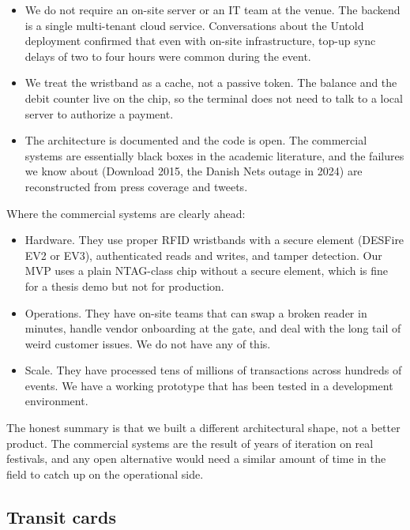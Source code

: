 \begin{itemize}
    \item We do not require an on-site server or an IT team at the venue. The backend is a single multi-tenant cloud service. Conversations about the Untold deployment confirmed that even with on-site infrastructure, top-up sync delays of two to four hours were common during the event.
    \item We treat the wristband as a cache, not a passive token. The balance and the debit counter live on the chip, so the terminal does not need to talk to a local server to authorize a payment.
    \item The architecture is documented and the code is open. The commercial systems are essentially black boxes in the academic literature, and the failures we know about (Download 2015, the Danish Nets outage in 2024) are reconstructed from press coverage and tweets.
\end{itemize}

Where the commercial systems are clearly ahead:

\begin{itemize}
    \item Hardware. They use proper RFID wristbands with a secure element (DESFire EV2 or EV3), authenticated reads and writes, and tamper detection. Our MVP uses a plain NTAG-class chip without a secure element, which is fine for a thesis demo but not for production.
    \item Operations. They have on-site teams that can swap a broken reader in minutes, handle vendor onboarding at the gate, and deal with the long tail of weird customer issues. We do not have any of this.
    \item Scale. They have processed tens of millions of transactions across hundreds of events. We have a working prototype that has been tested in a development environment.
\end{itemize}

The honest summary is that we built a different architectural shape, not a better product. The commercial systems are the result of years of iteration on real festivals, and any open alternative would need a similar amount of time in the field to catch up on the operational side.

\subsection{Transit cards}
\label{subsec:transit-comparison}

